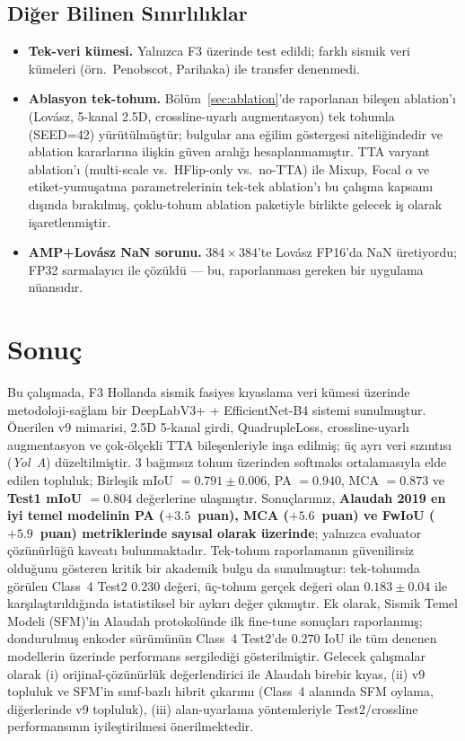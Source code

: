 \documentclass[conference,a4paper,10pt]{IEEEtran}
\begin{document}
\subsection{Diğer Bilinen Sınırlılıklar}

\begin{itemize}
\item \textbf{Tek-veri kümesi.} Yalnızca F3 üzerinde test edildi; farklı
sismik veri kümeleri (örn.\ Penobscot, Parihaka) ile transfer
denenmedi.
\item \textbf{Ablasyon tek-tohum.} Bölüm~\ref{sec:ablation}'de raporlanan
bileşen ablation'ı (Lovász, 5-kanal 2.5D, crossline-uyarlı augmentasyon)
tek tohumla (SEED=42) yürütülmüştür; bulgular ana eğilim göstergesi
niteliğindedir ve ablation kararlarına ilişkin güven aralığı
hesaplanmamıştır. TTA varyant ablation'ı (multi-scale vs.\ HFlip-only
vs.\ no-TTA) ile Mixup, Focal $\alpha$ ve etiket-yumuşatma parametrelerinin
tek-tek ablation'ı bu çalışma kapsamı dışında bırakılmış, çoklu-tohum
ablation paketiyle birlikte gelecek iş olarak işaretlenmiştir.
\item \textbf{AMP+Lov\'asz NaN sorunu.} $384\times 384$'te Lovász
FP16'da NaN üretiyordu; FP32 sarmalayıcı ile çözüldü --- bu, raporlanması
gereken bir uygulama nüansıdır.
\end{itemize}

\section{Sonuç}
\label{sec:sonuc}

Bu çalışmada, F3 Hollanda sismik fasiyes kıyaslama veri kümesi üzerinde
metodoloji-sağlam bir DeepLabV3+ + EfficientNet-B4 sistemi sunulmuştur.
Önerilen v9 mimarisi, 2.5D 5-kanal girdi, QuadrupleLoss, crossline-uyarlı
augmentasyon ve çok-ölçekli TTA bileşenleriyle inşa edilmiş; üç ayrı
veri sızıntısı (\emph{Yol~A}) düzeltilmiştir. 3 bağımsız tohum üzerinden
softmaks ortalamasıyla elde edilen topluluk; Birleşik mIoU $= 0.791 \pm
0.006$, PA $= 0.940$, MCA $= 0.873$ ve \textbf{Test1 mIoU $= 0.804$}
değerlerine ulaşmıştır. Sonuçlarımız, \textbf{Alaudah 2019 en iyi temel
modelinin PA ($+3.5$~puan), MCA ($+5.6$~puan) ve FwIoU ($+5.9$~puan)
metriklerinde sayısal olarak üzerinde}; yalnızca evaluator çözünürlüğü
kaveatı bulunmaktadır. Tek-tohum raporlamanın güvenilirsiz olduğunu
gösteren kritik bir akademik bulgu da sunulmuştur: tek-tohumda görülen
Class~4 Test2 $0.230$ değeri, üç-tohum gerçek değeri olan $0.183 \pm 0.04$
ile karşılaştırıldığında istatistiksel bir aykırı değer çıkmıştır.
Ek olarak, Sismik Temel Modeli (SFM)'in Alaudah protokolünde ilk
fine-tune sonuçları raporlanmış; dondurulmuş enkoder sürümünün Class~4
Test2'de $0.270$ IoU ile tüm denenen modellerin üzerinde performans
sergilediği gösterilmiştir. Gelecek çalışmalar olarak (i) orijinal-çözünürlük
değerlendirici ile Alaudah birebir kıyas, (ii) v9 topluluk ve SFM'in
sınıf-bazlı hibrit çıkarımı (Class~4 alanında SFM oylama, diğerlerinde
v9 topluluk), (iii) alan-uyarlama yöntemleriyle Test2/crossline
performansının iyileştirilmesi önerilmektedir.
\end{document}
